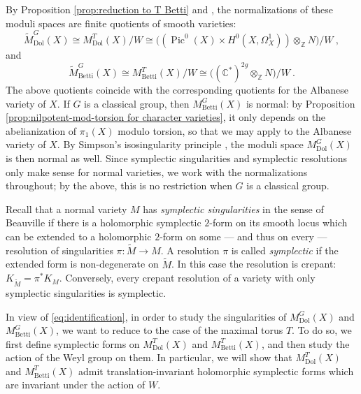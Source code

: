 \documentclass[11pt, a4paper]{amsart}
\theoremstyle{definition}
\theoremstyle{myitemstyle}
\newcommand{\Z}{\mathbb{Z}}
\newcommand{\C}{\mathbb{C}}
\DeclareMathOperator{\Pic}{Pic}
\newcommand{\Dol}{{\mathrm{Dol}}}
\newcommand{\Betti}{{\mathrm{Betti}}}
\begin{document}
By Proposition \ref{prop:reduction to T Betti} and , the normalizations of these moduli spaces are finite quotients of smooth varieties:
\begin{equation}\label{eq:identification}
\widetilde M^G_\Dol(X)\cong M^T_\Dol(X)/W\cong\big((\Pic^0(X)\times H^0(X,\Omega^1_X))\otimes_\Z N\big)/W\ ,
\end{equation}
and
\[
\widetilde M^G_\Betti(X)\cong M^T_\Betti(X)/W\cong\big((\C^*)^{2g}\otimes_\Z N\big)/W\ .
\]
The above quotients coincide with the corresponding quotients for the Albanese variety of $X$.  
If $G$ is a classical group, then $M^G_\Betti(X)$ is normal: by Proposition \ref{prop:nilpotent-mod-torsion for character varieties}, it only depends on the abelianization of $\pi_1(X)$ modulo torsion, so that we may apply \cite[Theorem 4]{BFN24} to the Albanese variety of $X$. By Simpson's isosingularity principle \cite[Theorem 10.6]{SimII}, the moduli space $M^G_\Dol(X)$ is then normal as well. Since symplectic singularities and symplectic resolutions only make sense for normal varieties, we work with the normalizations throughout; by the above, this is no restriction when $G$ is a classical group.

Recall that a normal variety $M$ has \emph{symplectic singularities} in the sense of Beauville \cite{Be00} if   there is a holomorphic symplectic $2$-form on its smooth locus which can be extended to a holomorphic $2$-form on some --- and thus on every --- resolution of singularities $\pi\colon\widetilde M\to M$. A resolution $\pi$ is called \emph{symplectic} if the extended form is non-degenerate on $\widetilde M$. In this case the resolution is crepant: $K_{\widetilde M}=\pi^*K_M$. Conversely, every crepant resolution of a variety with only symplectic singularities is symplectic.


In view of \eqref{eq:identification}, in order to study the singularities of $M^G_\Dol(X)$ and $M^G_\Betti(X)$, we want to reduce to the case of the maximal torus $T$. To do so, we first define  symplectic forms on $M^T_\Dol(X)$ and $M^T_\Betti(X)$, and then  study the action of the Weyl group on them. In particular, we will show that $M^T_\Dol(X)$ and $M^T_\Betti(X)$ admit translation-invariant holomorphic symplectic forms which are invariant under the action of $W$.
\end{document}
